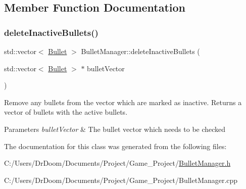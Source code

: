 \subsection{Member Function Documentation}
\mbox{\label{class_bullet_manager_a834ec287e01fc2ed7c5d3885e4b380c6}} 
\subsubsection{\texorpdfstring{delete\+Inactive\+Bullets()}{deleteInactiveBullets()}}
{\footnotesize\ttfamily std\+::vector$<$ \hyperlink{class_bullet}{Bullet} $>$ Bullet\+Manager\+::delete\+Inactive\+Bullets (\begin{DoxyParamCaption}\item[{std\+::vector$<$ \hyperlink{class_bullet}{Bullet} $>$ $\ast$}]{bullet\+Vector }\end{DoxyParamCaption})}



Remove any bullets from the vector which are marked as inactive. Returns a vector of bullets with the active bullets. 


\begin{DoxyParams}{Parameters}
{\em bullet\+Vector} & The bullet vector which needs to be checked \\
\hline
\end{DoxyParams}


The documentation for this class was generated from the following files\+:\begin{DoxyCompactItemize}
\item 
C\+:/\+Users/\+Dr\+Doom/\+Documents/\+Project/\+Game\+\_\+\+Project/\hyperlink{_bullet_manager_8h}{Bullet\+Manager.\+h}\item 
C\+:/\+Users/\+Dr\+Doom/\+Documents/\+Project/\+Game\+\_\+\+Project/Bullet\+Manager.\+cpp\end{DoxyCompactItemize}
